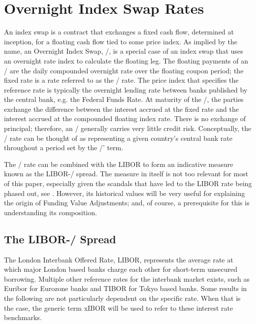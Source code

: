 \documentclass[main.tex]{subfiles}
\begin{document}
    \section{Overnight Index Swap Rates}
    
    An index swap is a contract that exchanges a fixed cash flow, determined at inception,
    for a floating cash flow tied to some price index.
    As implied by the name, an Overnight Index Swap, \OIS/, is a special case of an index swap
    that uses an overnight rate index to calculate the floating leg.
    The floating payments of an \OIS/ are the daily compounded overnight rate 
    over the floating coupon period;
    the fixed rate is a rate referred to as the \OIS/ rate.
    The price index that specifies the reference rate is typically the overnight 
    lending rate between banks published by the central bank, e.g. the Federal Funds Rate.
    At maturity of the \OIS/, the parties exchange the difference between the interest accrued 
    at the fixed rate and the interest accrued at the compounded floating index rate.
    There is no exchange of principal; 
    therefore, an \OIS/ generally carries very little credit risk. 
    Conceptually, the \OIS/ rate can be thought of as representing a given country's
    central bank rate throughout a period set by the \OIS/' term. 

    The \OIS/ rate can be combined with the LIBOR to form an indicative measure
    known as the LIBOR-\OIS/ spread.
    The measure in itself is not too relevant for most of this paper,
    especially given the scandals that have led to the LIBOR rate being phased out,
    see \textcite{ForbesLibor}.
    However, its historical values will be very useful 
    for explaining the origin of Funding Value Adjustments;
    and, of course, a prerequisite for this is understanding its composition.

    \subsection{The LIBOR-\OIS/ Spread}

    The London Interbank Offered Rate, LIBOR, represents the average rate 
    at which major London based banks charge each other for short-term unsecured borrowing.
    Multiple other reference rates for the interbank market exists, 
    such as Euribor for Eurozone banks and TIBOR for Tokyo based banks.
    Some results in the following are not particularly dependent on the specific rate.
    When that is the case, the generic term xIBOR will be used 
    to refer to these interest rate benchmarks.
\end{document}
